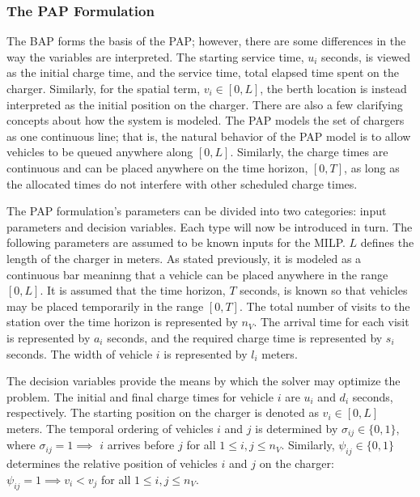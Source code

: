 \documentclass[ee,thesis]{usuthesis}
\begin{document}
\subsubsection{The PAP Formulation}
\label{sec:the-pap-formulation}
The BAP forms the basis of the PAP; however, there are some differences in the way the variables are interpreted. The
starting service time, \(u_i\) seconds, is viewed as the initial charge time, and the service time, total elapsed time
spent on the charger. Similarly, for the spatial term, \(v_i \in [0,L]\), the berth location is instead interpreted as the
initial position on the charger. There are also a few clarifying concepts about how the system is modeled. The PAP
models the set of chargers as one continuous line; that is, the natural behavior of the PAP model is to allow vehicles
to be queued anywhere along \([0,L]\). Similarly, the charge times are continuous and can be placed anywhere on the time
horizon, \([0,T]\), as long as the allocated times do not interfere with other scheduled charge times.

The PAP formulation's parameters can be divided into two categories: input parameters and decision variables. Each type
will now be introduced in turn. The following parameters are assumed to be known inputs for the MILP. \(L\) defines the
length of the charger in meters. As stated previously, it is modeled as a continuous bar meaninng that a vehicle can be
placed anywhere in the range \([0,L]\). It is assumed that the time horizon, \(T\) seconds, is known so that vehicles may be
placed temporarily in the range \([0,T]\). The total number of visits to the station over the time horizon is represented
by \(n_V\). The arrival time for each visit is represented by \(a_i\) seconds, and the required charge time is represented
by \(s_i\) seconds. The width of vehicle \(i\) is represented by \(l_i\) meters.

The decision variables provide the means by which the solver may optimize the problem. The initial and final charge
times for vehicle \(i\) are \(u_i\) and \(d_i\) seconds, respectively. The starting position on the charger is denoted as \(v_i
\in [0,L]\) meters. The temporal ordering of vehicles \(i\) and \(j\) is determined by \(\sigma_{ij} \in \{0, 1\}\), where \(\sigma_{ij} = 1
\implies\) \(i\) arrives before \(j\) for all \(1 \le i,j \le n_V\). Similarly, \(\psi_{ij} \in \{0, 1\}\) determines the relative
position of vehicles \(i\) and \(j\) on the charger: \(\psi_{ij} = 1 \implies v_i < v_j\) for all \(1 \le i,j \le n_V\).
\end{document}
